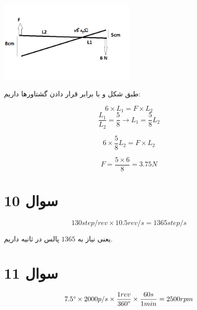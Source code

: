 \documentclass[12pt]{article}
\begin{document}
 
 \begin{center}
 	\includegraphics[width =0.5\textwidth]{images/3.png}
 \end{center}

طبق شکل و با برابر قرار دادن گشتاورها داریم:

$$6 \times L_1 = F \times L_2$$
$$\frac{L_1}{L_2} = \frac{5}{8} \rightarrow L_1 = \frac{5}{8}L_2$$

$$6 \times \frac{5}{8} L_2 = F \times L_2$$

$$F = \frac{5 \times 6}{8} = 3.75 N$$


\section*{سوال 10}

$$130 step/rev \times 10.5 rev/s = 1365 step/s$$

یعنی نیاز به $1365$ پالس در ثانیه داریم.

\section*{سوال 11}

$$7.5 \degree \times 2000 p/s \times \frac{1rev}{360\degree} \times \frac{60s}{1 min} =  2500 rpm$$
 
 
\end{document}
